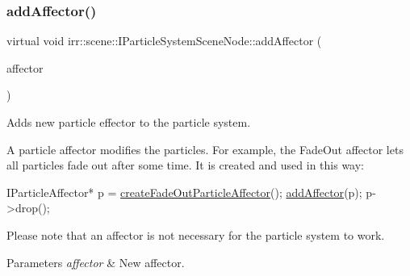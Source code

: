 \subsubsection{\texorpdfstring{add\+Affector()}{addAffector()}}
{\footnotesize\ttfamily virtual void irr\+::scene\+::\+I\+Particle\+System\+Scene\+Node\+::add\+Affector (\begin{DoxyParamCaption}\item[{\hyperlink{classirr_1_1scene_1_1IParticleAffector}{I\+Particle\+Affector} $\ast$}]{affector }\end{DoxyParamCaption})\hspace{0.3cm}{\ttfamily [pure virtual]}}



Adds new particle effector to the particle system. 

A particle affector modifies the particles. For example, the Fade\+Out affector lets all particles fade out after some time. It is created and used in this way\+: 
\begin{DoxyCode}
IParticleAffector* p = \hyperlink{classirr_1_1scene_1_1IParticleSystemSceneNode_a4a9c3ecdf6118267f312f9389bb24888}{createFadeOutParticleAffector}();
\hyperlink{classirr_1_1scene_1_1IParticleSystemSceneNode_a401f5afbbb748878011c5ceb7d447f8b}{addAffector}(p);
p->drop();
\end{DoxyCode}
 Please note that an affector is not necessary for the particle system to work. 
\begin{DoxyParams}{Parameters}
{\em affector} & New affector. \\
\hline
\end{DoxyParams}
\mbox{\label{classirr_1_1scene_1_1IParticleSystemSceneNode_a1459245186d570f81f6c7ff78ddd38db}} 
